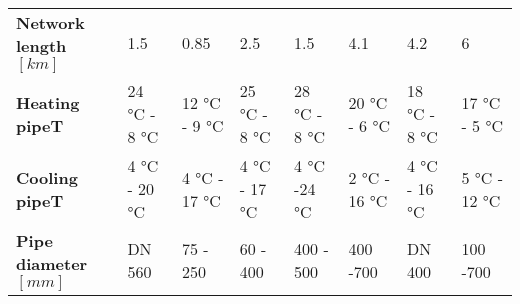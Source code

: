 \begin{landscape}
\begin{table}[h]
\begin{tabular}{llllllll}
\midrule
\textbf{Network length $[km]$}                                                   & 1.5                                                                                & 0.85                                                                        & 2.5                                                                                                   & 1.5                                                                               & 4.1                                                                      & 4.2                                                                   & 6                                                                             \\
\textbf{Heating pipeT}                                                         & 24 \si{\celsius} - 8 \si{\celsius}                                                                       & 12 \si{\celsius} - 9 \si{\celsius}                                                                & 25 \si{\celsius} - 8 \si{\celsius}                                                                                          & 28 \si{\celsius} - 8 \si{\celsius}                                                                      & 20 \si{\celsius} - 6 \si{\celsius}                                                             & 18 \si{\celsius} - 8 \si{\celsius}                                                          & 17 \si{\celsius} - 5 \si{\celsius}                                                                  \\
\textbf{Cooling pipeT}                                                         & 4 \si{\celsius} - 20 \si{\celsius}                                                                       & 4 \si{\celsius} - 17 \si{\celsius}                                                                & 4 \si{\celsius} - 17 \si{\celsius}                                                                                          & 4 \si{\celsius} -24 \si{\celsius}                                                                       & 2 \si{\celsius} - 16 \si{\celsius}                                                             & 4 \si{\celsius} - 16 \si{\celsius}                                                          & 5 \si{\celsius} - 12 \si{\celsius}                                                                  \\
\textbf{Pipe diameter $[mm]$}                                                    & DN 560                                                                             & 75 - 250                                                                    & 60 - 400                                                                                              & 400 - 500                                                                         & 400 -700                                                                 & DN 400                                                                & 100 -700                                                                      \\

\end{tabular}
\end{table}
\end{landscape}
